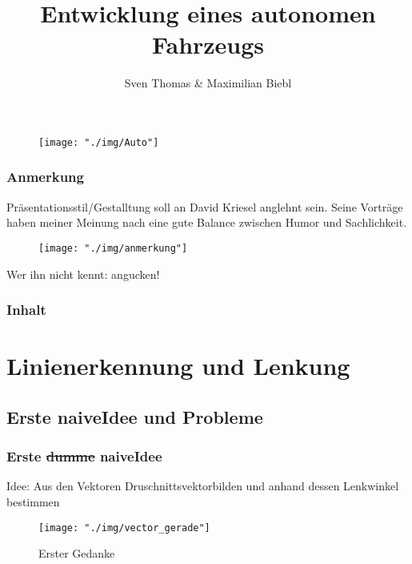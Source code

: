 \documentclass{beamer}
\title[]{Entwicklung eines autonomen Fahrzeugs}
\author{Sven Thomas \& Maximilian Biebl}
\institute[THM]{Technische Hochschule Mittelhessen}
\date{}
\begin{document}
	\begin{frame}
		\begin{center}
				\begin{figure}[h]
					\texttt{[image: "./img/Auto"]}
					\label{fig:Auto}
				\end{figure}
		\end{center}
		\titlepage
			
	\end{frame}
	\begin{frame}
		\frametitle{Anmerkung}
		Präsentationsstil/Gestalltung soll an David Kriesel anglehnt sein. Seine Vorträge haben meiner Meinung nach eine gute Balance zwischen Humor und Sachlichkeit.
		\begin{center}
			\begin{figure}[h]
				\texttt{[image: "./img/anmerkung"]}
				\label{fig:anmerkung}
			\end{figure}
		\end{center}
		Wer ihn nicht kennt: angucken!
	\end{frame}
	\begin{frame}
		\frametitle{Inhalt}
		\tableofcontents
	\end{frame}

	\section{Linienerkennung und Lenkung}
	
	\subsection{Erste \glqq naive\grqq Idee und Probleme}

	\begin{frame}
		\frametitle{Erste \sout{dumme} \glqq naive\grqq  Idee}
		Idee: Aus den Vektoren \glqq Druschnittsvektor\grqq \space bilden  und anhand dessen Lenkwinkel bestimmen
		\begin{center}
			\begin{figure}[h]
				\texttt{[image: "./img/vector\_gerade"]}
				\caption{Erster Gedanke}
				\label{fig:Lenkung via Vektoren in Gerade}
			\end{figure}
		\end{center}
	\end{frame}
\end{document}
